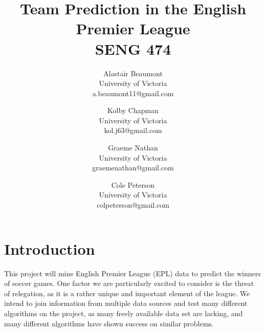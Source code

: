 \documentclass[conference]{IEEEtran}
\begin{document}
%

\title{Team Prediction in the English Premier League\\ {\large SENG 474}}

\author{%
  Alastair Beaumont\\University of Victoria\\a.beaumont11@gmail.com
  \and Kolby Chapman\\University of Victoria\\kol.j63@gmail.com
  \and Graeme Nathan\\University of Victoria\\graemenathan@gmail.com
  \and Cole Peterson\\University of Victoria\\colpeterson@gmail.com
}

\maketitle

\IEEEpeerreviewmaketitle

\section{Introduction}
This project will mine English Premier League (EPL) data to predict the winners of soccer games. One factor we are particularly excited to consider is the threat of relegation, as it is a rather unique and important element of the league. We intend to join information from multiple data sources and test many different algorithms on the project, as many freely available data set are lacking, and many different algorithms have shown success on similar problems.
\end{document}
